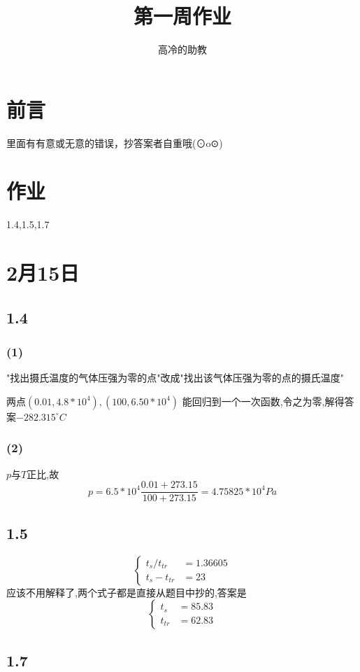 \documentclass{article}
\title{第一周作业}
\author{高冷的助教}
\begin{document}
\maketitle
\section*{前言}
里面有有意或无意的错误，抄答案者自重哦(⊙o⊙)
\section*{作业}
1.4,1.5,1.7
\section{2月15日}
\subsection*{1.4}
\subsubsection*{(1)}
"找出摄氏温度的气体压强为零的点"改成"找出该气体压强为零的点的摄氏温度"

两点$(0.01, 4.8*10^4), (100, 6.50*10^4)$
能回归到一个一次函数,令之为零,解得答案$-282.315^{\circ}C$

\subsubsection*{(2)}
$p$与$T$正比,故
\begin{equation}
p=6.5*10^4 \frac{0.01 + 273.15}{100 + 273.15}=4.75825*10^4 Pa
\end{equation}
\subsection*{1.5}
\begin{equation}
	\left\{\begin{aligned}
	t_s/t_{tr}&=1.36605\\
	t_s-t_{tr}&=23
	\end{aligned}\right.
\end{equation}
应该不用解释了,两个式子都是直接从题目中抄的,答案是
\begin{equation}
\left\{\begin{aligned}
t_s &= 85.83\\
t_{tr}&=62.83
\end{aligned}\right.
\end{equation}
\subsection*{1.7}
\end{document}

